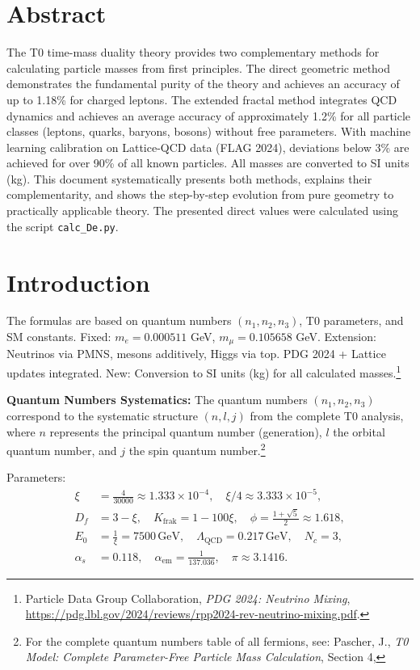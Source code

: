 \section*{Abstract}
		The T0 time-mass duality theory provides two complementary methods for calculating particle masses from first principles. The direct geometric method demonstrates the fundamental purity of the theory and achieves an accuracy of up to 1.18\% for charged leptons. The extended fractal method integrates QCD dynamics and achieves an average accuracy of approximately 1.2\% for all particle classes (leptons, quarks, baryons, bosons) without free parameters. With machine learning calibration on Lattice-QCD data (FLAG 2024), deviations below 3\% are achieved for over 90\% of all known particles. All masses are converted to SI units (kg). This document systematically presents both methods, explains their complementarity, and shows the step-by-step evolution from pure geometry to practically applicable theory. The presented direct values were calculated using the script \texttt{calc\_De.py}.

	
	
	\section{Introduction}
	\label{sec:introduction}
	
	The formulas are based on quantum numbers $(n_1, n_2, n_3)$, T0 parameters, and SM constants. Fixed: $m_e = 0.000511$ GeV, $m_\mu = 0.105658$ GeV. Extension: Neutrinos via PMNS, mesons additively, Higgs via top. PDG 2024 + Lattice updates integrated. New: Conversion to SI units (kg) for all calculated masses.\footnote{Particle Data Group Collaboration, \emph{PDG 2024: Neutrino Mixing}, \url{https://pdg.lbl.gov/2024/reviews/rpp2024-rev-neutrino-mixing.pdf}.}
	
	\textbf{Quantum Numbers Systematics:} The quantum numbers $(n_1, n_2, n_3)$ correspond to the systematic structure $(n, l, j)$ from the complete T0 analysis, where $n$ represents the principal quantum number (generation), $l$ the orbital quantum number, and $j$ the spin quantum number.\footnote{For the complete quantum numbers table of all fermions, see: Pascher, J., \emph{T0 Model: Complete Parameter-Free Particle Mass Calculation}, Section 4, }
	
	Parameters:
	\begin{align}
		\xi &= \frac{4}{30000} \approx 1.333 \times 10^{-4}, \quad \xi/4 \approx 3.333 \times 10^{-5}, \nonumber \\
		D_f &= 3 - \xi, \quad K_{\text{frak}} = 1 - 100\xi, \quad \phi = \frac{1 + \sqrt{5}}{2} \approx 1.618, \nonumber \\
		E_0 &= \frac{1}{\xi} = 7500 \, \text{GeV}, \quad \Lambda_{\text{QCD}} = 0.217 \, \text{GeV}, \quad N_c = 3, \nonumber \\
		\alpha_s &= 0.118, \quad \alpha_{\text{em}} = \frac{1}{137.036}, \quad \pi \approx 3.1416.
	\end{align}
	
